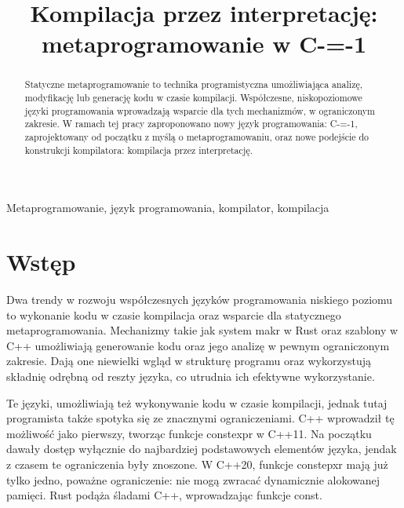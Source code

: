\documentclass[conference]{IEEEtran}
\begin{document}
\title{Kompilacja przez interpretację: metaprogramowanie w C-=-1
}

\author{
}

\maketitle

\begin{abstract}
    Statyczne metaprogramowanie to technika programistyczna umożliwiająca analizę, modyfikację lub generację kodu w czasie kompilacji.
    Współczesne, niskopoziomowe języki programowania wprowadzają wsparcie dla tych mechanizmów, w ograniczonym zakresie.
    W ramach tej pracy zaproponowano nowy język programowania: C-=-1, zaprojektowany od początku z myślą o metaprogramowaniu, oraz nowe podejście do konstrukcji kompilatora: kompilacja przez interpretację.
\end{abstract}

\begin{IEEEkeywords}
    Metaprogramowanie, język programowania, kompilator, kompilacja
\end{IEEEkeywords}

\section{Wstęp}
Dwa trendy w rozwoju współczesnych języków programowania niskiego poziomu to wykonanie kodu w czasie kompilacja oraz wsparcie dla statycznego metaprogramowania.
Mechanizmy takie jak system makr w Rust oraz szablony w C++ umożliwiają generowanie kodu oraz jego analizę w pewnym ograniczonym zakresie.
Dają one niewielki wgląd w strukturę programu oraz wykorzystują składnię odrębną od reszty języka, co utrudnia ich efektywne wykorzystanie.

Te języki, umożliwiają też wykonywanie kodu w czasie kompilacji, jednak tutaj programista także spotyka się ze znacznymi ograniczeniami.
C++ wprowadził tę możliwość jako pierwszy, tworząc funkcje constexpr w C++11.
Na początku dawały dostęp wyłącznie do najbardziej podstawowych elementów języka, jendak z czasem te ograniczenia były znoszone.
W C++20, funkcje constepxr mają już tylko jedno, poważne ograniczenie: nie mogą zwracać dynamicznie alokowanej pamięci.
Rust podąża śladami C++, wprowadzając funkcje const.
\end{document}
